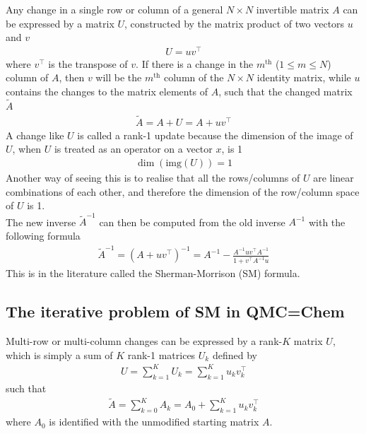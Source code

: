 \documentclass[11pt]{article}
\numberwithin{figure}{section}
\numberwithin{table}{section}
\begin{document}
			Any change in a single row or column of a general $N\times N$ invertible matrix $A$ can be expressed by a matrix $U$, constructed by the matrix product of two vectors $u$ and $v$
			\begin{align}
				U=uv^\top
			\end{align}
			where $v^\top$ is the transpose of $v$.
			If there is a change in the $m^\mathrm{th}$ ($1\leq m\leq N$) column of $A$, then $v$ will be the $m^\mathrm{th}$ column of the $N\times N$ identity matrix, while $u$ contains the changes to the matrix elements of $A$, such that the changed matrix $\widetilde{A}$
			\begin{align}
				\widetilde{A} = A + U = A + uv^\top
			\end{align}
			A change like $U$ is called a rank-1 update because the dimension of the image of $U$, when $U$ is treated as an operator on a vector $x$, is 1
			\begin{align}
				\dim(\mathrm{img}(U))=1
			\end{align}
			Another way of seeing this is to realise that all the rows/columns of $U$ are linear combinations of each other, and therefore the dimension of the row/column space of $U$ is 1.\\
			
			The new inverse $\widetilde{A}^{-1}$ can then be computed from the old inverse $A^{-1}$ with the following formula
			\begin{align}
				\widetilde{A}^{-1}=\left(A+uv^\top\right)^{-1} = A^{-1} - \frac{A^{-1}uv^\top A^{-1}}{1+v^\top A^{-1}u}
			\end{align}
			This is in the literature called the Sherman-Morrison (SM) formula.
			
			
          \subsection{The iterative problem of SM in QMC=Chem}
			Multi-row or multi-column changes can be expressed by a rank-$K$ matrix $U$, which is simply a sum of $K$ rank-1 matrices $U_k$ defined by
			\begin{align}
				U = \sum_{k=1}^K U_k = \sum_{k=1}^K u_kv_k^\top
			\end{align}
			such that 
			\begin{align}\label{eqn:rank-k}
				\widetilde{A} = \sum_{k=0}^K A_k =  A_0 + \sum_{k=1}^K u_kv_k^\top
			\end{align}
			where $A_0$ is identified with the unmodified starting matrix $A$.
			
\end{document}
